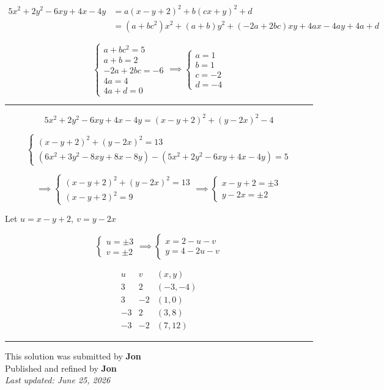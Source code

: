 \documentclass[12pt]{article}
\begin{document}
\newcommand{\ds}{\displaystyle}
\begin{align*}
    5x^2+2y^2-6xy+4x-4y&=a(x-y+2)^2+b(cx+y)^2+d\\
    &=(a+bc^2)x^2+(a+b)y^2+(-2a+2bc)xy +4ax-4ay+4a+d
\end{align*}


$$
\begin{cases}
a+bc^2=5\\
a+b=2\\
-2a+2bc=-6\\
4a=4\\
4a+d=0
\end{cases}
\implies
\begin{cases}
a=1\\
b=1\\
c=-2\\
d=-4
\end{cases}
$$

\bigskip\hrule\bigskip

$$5x^2+2y^2-6xy+4x-4y=(x-y+2)^2+(y-2x)^2-4$$

$$
\begin{cases}
(x-y+2)^2+(y-2x)^2=13\\
(6x^2+3y^2-8xy+8x-8y)-(5x^2+2y^2-6xy+4x-4y)=5
\end{cases}
$$

$$
\implies
\begin{cases}
(x-y+2)^2+(y-2x)^2=13\\
(x-y+2)^2=9
\end{cases}
\implies
\begin{cases}
x-y+2=\pm3\\
y-2x=\pm2
\end{cases}
$$

Let $\ds u=x-y+2,\  v=y-2x$

$$
\begin{cases}
u=\pm3\\
v=\pm2
\end{cases}
\implies
\begin{cases}
x=2-u-v\\
y=4-2u-v
\end{cases}
$$

$$
\begin{array}{c|c|c}
u&v&(x,y)\\
\hline
3&2&(-3,-4)\\
3&-2&(1,0)\\
-3&2&(3,8)\\
-3&-2&(7,12)
\end{array}
$$

\bigskip
\hrule
\begin{center}
    This solution was submitted by \textbf{Jon}\\[4pt]
    Published and refined by \textbf{Jon}\\[8pt]
    \textit{Last updated: June 25, 2026}
\end{center}
\end{document}

